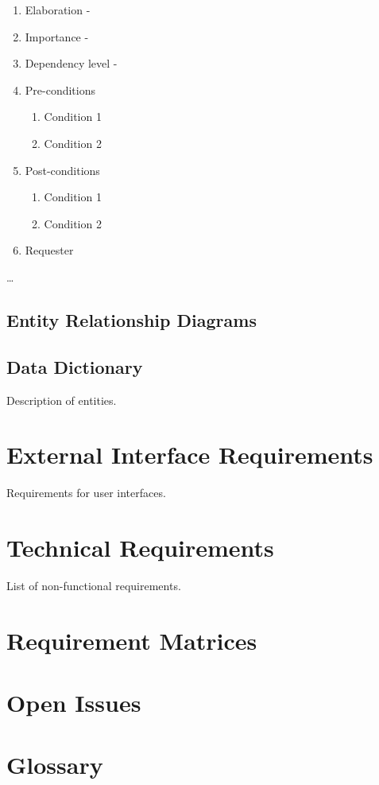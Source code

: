 \documentclass[12pt]{article}
\begin{document}
\begin{enumerate}
  \begin{enumerate}
    \item Elaboration - 
    \item Importance - 
    \item Dependency level - 
    \item Pre-conditions
    \begin{enumerate}
    	\item Condition 1
    	\item Condition 2
    \end{enumerate}
        \item Post-conditions
    \begin{enumerate}
    	\item Condition 1
    	\item Condition 2
    \end{enumerate}
    \item Requester
  \end{enumerate}
  \ldots
\end{enumerate}




\newpage

\subsection{Entity Relationship Diagrams}

\subsection{Data Dictionary}
Description of entities.

\section{External Interface Requirements}
Requirements for user interfaces.

\section{Technical Requirements}
List of non-functional requirements.

\section{Requirement Matrices}

\section{Open Issues}

\section{Glossary}
\end{document}
